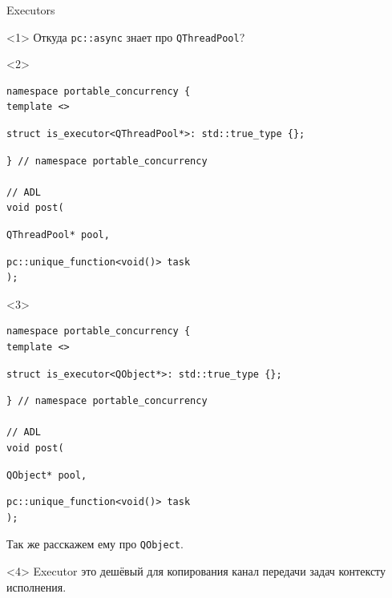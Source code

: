 \documentclass[aspectratio=169,hyperref={unicode},17pt]{beamer}
\begin{document}
\begin{frame}[fragile,t]{Executors}
\begin{onlyenv}<1>
Откуда \texttt{pc::async} знает про \texttt{QThreadPool}?
\end{onlyenv}
\begin{onlyenv}<2>
\begin{lstlisting}[style=cppcode,aboveskip=0pt,belowskip=0pt]
namespace portable_concurrency {
template <>
\end{lstlisting}
\begin{lstlisting}[style=cppcode,backgroundcolor=\color{gray!30},aboveskip=0pt,belowskip=0pt]
struct is_executor<QThreadPool*>: std::true_type {};
\end{lstlisting}
\begin{lstlisting}[style=cppcode,aboveskip=0pt,belowskip=0pt]
} // namespace portable_concurrency

// ADL
void post(
\end{lstlisting}
\begin{lstlisting}[style=cppcode,backgroundcolor=\color{gray!30},aboveskip=0pt,belowskip=0pt]
  QThreadPool* pool,
\end{lstlisting}
\begin{lstlisting}[style=cppcode,aboveskip=0pt,belowskip=0pt]
  pc::unique_function<void()> task
);
\end{lstlisting}
\end{onlyenv}
\begin{onlyenv}<3>
\begin{lstlisting}[style=cppcode,aboveskip=0pt,belowskip=0pt]
namespace portable_concurrency {
template <>
\end{lstlisting}
\begin{lstlisting}[style=cppcode,backgroundcolor=\color{gray!30},aboveskip=0pt,belowskip=0pt]
struct is_executor<QObject*>: std::true_type {};
\end{lstlisting}
\begin{lstlisting}[style=cppcode,aboveskip=0pt,belowskip=0pt]
} // namespace portable_concurrency

// ADL
void post(
\end{lstlisting}
\begin{lstlisting}[style=cppcode,backgroundcolor=\color{gray!30},aboveskip=0pt,belowskip=0pt]
  QObject* pool,
\end{lstlisting}
\begin{lstlisting}[style=cppcode,aboveskip=0pt,belowskip=0pt]
  pc::unique_function<void()> task
);
\end{lstlisting}
Так же расскажем ему про \texttt{QObject}.
\end{onlyenv}
\begin{onlyenv}<4>
Executor это дешёвый для копирования канал передачи задач контексту исполнения.


\end{onlyenv}
\end{frame}
\end{document}

